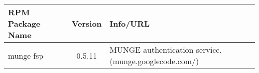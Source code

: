 \small
\begin{tabularx}{\textwidth}{l|c|X}
\toprule
{\bf RPM Package Name} & {\bf Version} & {\bf Info/URL}  \\ 
\midrule

\multirow{2}{*}{munge-fsp} & 
\multirow{2}{*}{0.5.11} & 
MUNGE authentication service. \newline (munge.googlecode.com/) 
\\ \hline 

\bottomrule
\end{tabularx}
